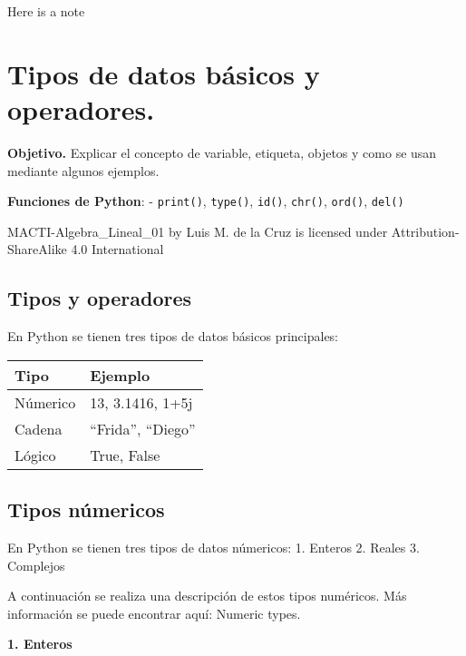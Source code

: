 \documentclass[
  letterpaper,
  DIV=11,
  numbers=noendperiod]{scrreprt}
\newenvironment{Shaded}{\begin{snugshade}}{\end{snugshade}}
\newcommand{\NormalTok}[1]{\textcolor[rgb]{0.00,0.23,0.31}{#1}}
\begin{document}
\begin{Shaded}
\begin{Highlighting}[]
\NormalTok{Here is a note}
\end{Highlighting}
\end{Shaded}


\chapter{Tipos de datos básicos y
operadores.}\label{tipos-de-datos-buxe1sicos-y-operadores.}

\textbf{Objetivo.} Explicar el concepto de variable, etiqueta, objetos y
como se usan mediante algunos ejemplos.

\textbf{Funciones de Python}: - \texttt{print()}, \texttt{type()},
\texttt{id()}, \texttt{chr()}, \texttt{ord()}, \texttt{del()}

MACTI-Algebra\_Lineal\_01 by Luis M. de la Cruz is licensed under
Attribution-ShareAlike 4.0 International

\section{Tipos y operadores}\label{tipos-y-operadores}

En Python se tienen tres tipos de datos básicos principales:

\begin{longtable}[]{@{}ll@{}}
\toprule\noalign{}
Tipo & Ejemplo \\
\midrule\noalign{}
\endhead
\bottomrule\noalign{}
\endlastfoot
Númerico & 13, 3.1416, 1+5j \\
Cadena & ``Frida'', ``Diego'' \\
Lógico & True, False \\
\end{longtable}

\section{Tipos númericos}\label{tipos-nuxfamericos}

En Python se tienen tres tipos de datos númericos: 1. Enteros 2. Reales
3. Complejos

A continuación se realiza una descripción de estos tipos numéricos. Más
información se puede encontrar aquí: Numeric types.

\textbf{1. Enteros}
\end{document}
